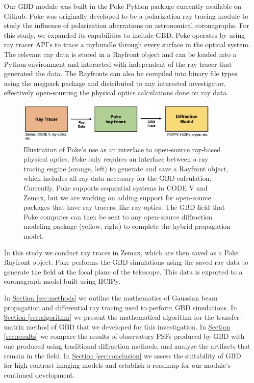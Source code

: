 Our GBD module was built in the Poke\cite{Ashcraft_poke_2022} Python package currently available on Github. Poke was originally developed to be a polarization ray tracing module to study the influence of polarization aberrations on astronomical coronagraphs\cite{anche_inprep}. For this study, we expanded its capabilities to include GBD. Poke operates by using ray tracer API's to trace a raybundle through every surface in the optical system. The relevant ray data is stored in a Rayfront object and can be loaded into a Python environment and interacted with independent of the ray tracer that generated the data. The Rayfronts can also be compiled into binary file types using the msgpack\cite{msgpack} package and distributed to any interested investigator, effectively open-sourcing the physical optics calculations done on ray data.
\begin{figure}[H]
    \centering
    \includegraphics[width=0.9\textwidth]{poke_modeling_revised.png}
    \caption{Illustration of Poke's use as an interface to open-source ray-based physical optics. Poke only requires an interface between a ray tracing engine (orange, left) to generate and save a Rayfront object, which includes all ray data necessary for the GBD calculation. Currently, Poke supports sequential systems in CODE V and Zemax, but we are working on adding support for open-source packages that have ray tracers, like ray-optics\cite{rayoptics}. The GBD field that Poke computes can then be sent to any open-source diffraction modeling package (yellow, right) to complete the hybrid propagation model.}
    \label{fig:poke_modeling}
\end{figure}

In this study we conduct ray traces in Zemax, which are then saved as a Poke Rayfront object. Poke performs the GBD simulations using the saved ray data to generate the field at the focal plane of the telescope. This data is exported to a coronagraph model built using HCIPy.

In \hyperref[sec:methods]{Section \ref{sec:methods}} we outline the mathematics of Gaussian beam propagation and differential ray tracing used to perform GBD simulations. In \hyperref[sec:algorithm]{Section \ref{sec:algorithm}} we present the mathematical algorithm for the transfer-matrix method of GBD that we developed for this investigation. In \hyperref[sec:results]{Section \ref{sec:results}} we compare the results of observatory PSFs produced by GBD with one produced using traditional diffraction methods, and analyze the artifacts that remain in the field. In \hyperref[sec:conclusion]{Section \ref{sec:conclusion}} we assess the suitability of GBD for high-contrast imaging models and establish a roadmap for our module's continued development.